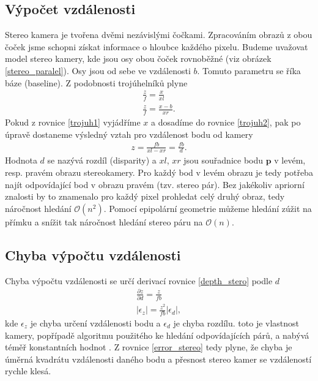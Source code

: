 \documentclass[twoside]{ctuthesis}
\newcommand{\tl}[1]{$\mathbf{#1}$}
\begin{document}
\subsection{Výpočet vzdálenosti}
Stereo kamera je tvořena dvěmi nezávislými čočkami. Zpracováním obrazů z obou čoček jsme schopni získat informace o hloubce každého pixelu. Budeme uvažovat model stereo kamery, kde jsou osy obou čoček rovnoběžné (viz obrázek \ref{stereo_paralel}). Osy jsou od sebe ve vzdálenosti $b$. Tomuto parametru se říka báze (baseline). Z podobnosti trojúhelníků plyne
\begin{align}
    \frac{z}{f} = \frac{x}{xl} \label{trojuh1} \\
    \frac{z}{f} = \frac{x - b}{xr} \label{trojuh2}.
\end{align}
Pokud z rovnice \ref{trojuh1} vyjádříme $x$ a dosadíme do rovnice \ref{trojuh2}, pak po úpravě dostaneme výsledný vztah pro vzdálenost bodu od kamery 
\begin{align}
    z = \frac{fb}{xl - xr} = \frac{fb}{d}.
    \label{depth_stero}
\end{align}
Hodnota $d$ se nazývá rozdíl (disparity) a $xl$, $xr$ jsou souřadnice bodu \tl{p} v levém, resp. pravém obrazu stereokamery. Pro každý bod v levém obrazu je tedy potřeba najít odpovídající bod v obrazu pravém (tzv. stereo pár). Bez jakékoliv apriorní znalosti by to znamenalo pro každý pixel prohledat celý druhý obraz, tedy náročnost hledání $\mathcal{O}(n^2)$. Pomocí epipolární geometrie můžeme hledání zúžit na přímku  a snížit tak náročnost hledání stereo páru na $\mathcal{O}(n)$. \cite{brown2003advances_in_stereo}

\subsection{Chyba výpočtu vzdálenosti}
Chyba výpočtu vzdálenosti se určí derivací rovnice \ref{depth_stero} podle $d$ \cite{keselman2017intel} 
\begin{align}
    \frac{\partial z}{\partial d} = \frac{z}{fb} \\
    |\epsilon_z | = \frac{z^2}{fb}|\epsilon_d |,
    \label{error_stereo}
\end{align}
kde $\epsilon_z $ je chyba určení vzdálenosti bodu a $ \epsilon_d $ je chyba rozdílu. toto je vlastnost kamery, popřípadě algoritmu použitého ke hledání odpovídajících párů, a nabývá téměř konstantních hodnot \cite{keselman2017intel}. Z rovnice \ref{error_stereo} tedy plyne, že chyba je úměrná kvadrátu vzdálenosti daného bodu a přesnost stereo kamer se vzdáleností rychle klesá.
\end{document}
